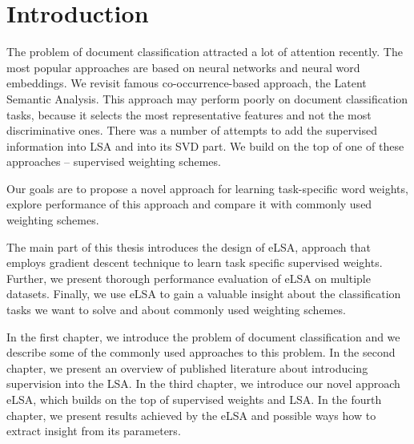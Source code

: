 \chapter*{Introduction}

The problem of document classification attracted a lot of attention recently. 
The most popular approaches are based on neural networks and neural word embeddings.
We revisit famous co-occurrence-based approach, the Latent Semantic Analysis.
This approach may perform poorly on document classification tasks, because it selects the most representative features and not the most discriminative ones. 
There was a number of attempts to add the supervised information into LSA and into its SVD part.
We build on the top of one of these approaches -- supervised weighting schemes.

\bigskip
Our goals are to propose a novel approach for learning task-specific word weights, explore performance of this approach and compare it with commonly used weighting schemes.
\bigskip

The main part of this thesis introduces the design of eLSA, approach that employs gradient descent technique to learn task specific supervised weights.
Further, we present thorough performance evaluation of eLSA on multiple datasets.
Finally, we use eLSA to gain a valuable insight about the classification tasks we want to solve and about commonly used weighting schemes.

\bigskip

In the first chapter, we introduce the problem of document classification and we describe some of the commonly used approaches to this problem.
In the second chapter, we present an overview of published literature about introducing supervision into the LSA.
In the third chapter, we introduce our novel approach eLSA, which builds on the top of supervised weights and LSA.
In the fourth chapter, we present results achieved by the eLSA and possible ways how to extract insight from its parameters. 



